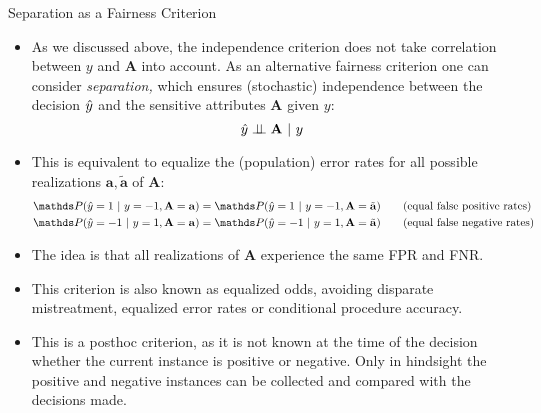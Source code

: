 \documentclass[11pt,compress,t,notes=noshow, xcolor=table]{beamer}
\newcommand{\sens}{\mathbf{A}} %
\newcommand{\ba}{\mathbf{a}}
\newcommand{\batilde}{\tilde{\mathbf{a}}}
\begin{document}
\begin{vbframe}{Separation as a Fairness Criterion}
	\footnotesize{
		\begin{itemize}
			\item As we discussed above, the independence criterion does not take correlation between $y$ and $\sens$ into account. As an alternative fairness criterion one can consider \emph{separation,} which ensures (stochastic) independence between the decision $\hat{y}$ and the sensitive attributes $\sens$ given $y:$
			$$	\yh \indep \sens ~|~y	$$
			\item This is equivalent to equalize the (population) error rates for all possible realizations $\ba,\batilde$ of $\sens:$
			\begin{align*}
				 &\P(  \yh = 1 ~|~ y = -1, \sens = \ba ) = \P(  \yh = 1 ~|~ y=-1, \sens = \batilde ) \tag{equal false positive rates}\\
				 &\P(  \yh = -1 ~|~ y = 1, \sens = \ba ) = \P(  \yh = -1 ~|~ y=1, \sens = \batilde ) \tag{equal false negative rates}
			\end{align*}
			\item The idea is that all realizations of $\sens$ experience the same FPR and FNR.
%				
			\item This criterion is also known as equalized odds, avoiding disparate mistreatment, equalized error rates or conditional procedure accuracy.
%			
			\item This is a posthoc criterion, as it is not known at the time of the decision whether the current instance is positive or negative. Only in hindsight the positive and negative instances can be collected and compared with the decisions made. 
		\end{itemize}
	}
\end{vbframe}
\end{document}
